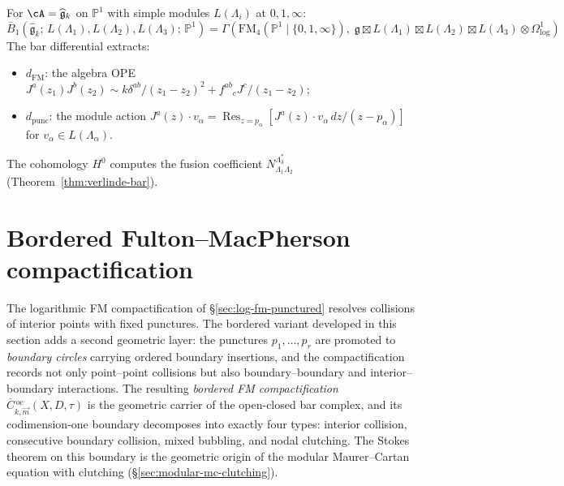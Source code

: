 \begin{example}\label{ex:log-fm-km}
For $\cA = \widehat{\mathfrak{g}}_k$ on $\mathbb{P}^1$ with
simple modules $L(\Lambda_i)$ at $0, 1, \infty$:
\[
\bar{B}_1(\widehat{\mathfrak{g}}_k;\,
L(\Lambda_1), L(\Lambda_2), L(\Lambda_3);\, \mathbb{P}^1)
= \Gamma(\mathrm{FM}_4(\mathbb{P}^1 \mathbin{|} \{0,1,\infty\}),\;
\mathfrak{g} \boxtimes L(\Lambda_1) \boxtimes L(\Lambda_2)
\boxtimes L(\Lambda_3) \otimes \Omega^1_{\log})
\]
The bar differential extracts:
\begin{itemize}
\item $d_{\mathrm{FM}}$: the algebra OPE
  $J^a(z_1) J^b(z_2) \sim k\delta^{ab}/(z_1 - z_2)^2
  + f^{ab}{}_c J^c/(z_1 - z_2)$;
\item $d_{\mathrm{punc}}$: the module action
  $J^a(z) \cdot v_\alpha
  = \operatorname{Res}_{z=p_\alpha}
  [J^a(z) \cdot v_\alpha \, dz/(z - p_\alpha)]$
  for $v_\alpha \in L(\Lambda_\alpha)$.
\end{itemize}
The cohomology $H^0$ computes the fusion coefficient
$N_{\Lambda_1 \Lambda_2}^{\Lambda_3^*}$
\textup{(}Theorem~\textup{\ref{thm:verlinde-bar})}.
\end{example}

\section{Bordered Fulton--MacPherson compactification}
\label{sec:bordered-fm}

The logarithmic FM compactification of \S\ref{sec:log-fm-punctured}
resolves collisions of interior points with fixed punctures.  The
bordered variant developed in this section adds a second geometric
layer: the punctures $p_1, \ldots, p_r$ are promoted to
\emph{boundary circles} carrying ordered boundary insertions, and
the compactification records not only point--point collisions but
also boundary--boundary and interior--boundary interactions.
The resulting \emph{bordered FM compactification}
$\overline{C}{}^{\,\mathrm{oc}}_{k,\vec{m}}(X, D, \tau)$ is the
geometric carrier of the open-closed bar complex, and its
codimension-one boundary decomposes into exactly four types: interior
collision, consecutive boundary collision, mixed bubbling, and nodal
clutching.  The Stokes theorem on this boundary is the geometric
origin of the modular Maurer--Cartan equation with clutching
(\S\ref{sec:modular-mc-clutching}).

